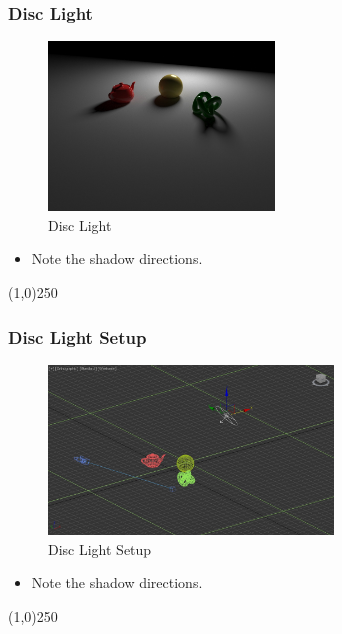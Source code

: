 \begin{frame}
	\frametitle{Disc Light}
	\begin{figure}
		\centering
		\includegraphics[height=4.5cm]{./Lights/Disc}
		\caption{Disc Light}
		\label{fig:DiscLight}
	\end{figure}
	\begin{itemize}
		\item Note the shadow directions.
	\end{itemize}
\end{frame}
\begin{center}\line(1,0){250}\end{center}


\begin{frame}
	\frametitle{Disc Light Setup}
	\begin{figure}
		\centering
		\includegraphics[height=4.5cm]{./Lights/DiscSetup}
		\caption{Disc Light Setup}
		\label{fig:DiscLightSetup}
	\end{figure}
	\begin{itemize}
		\item Note the shadow directions.
	\end{itemize}
\end{frame}
\begin{center}\line(1,0){250}\end{center}



